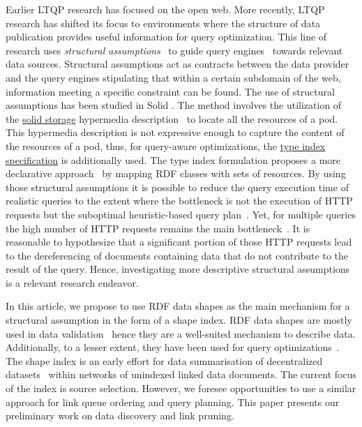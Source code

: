 Earlier LTQP research has focused on the open web.
More recently, LTQP research has shifted its focus to environments where the structure of data publication provides useful information for query optimization.
This line of research uses \emph{structural assumptions}~\cite{Taelman2023} to guide query engines~\cite{verborgh2020guided} towards relevant data sources.
Structural assumptions act as contracts between the data provider and the query engines stipulating that within a certain subdomain of the web, information meeting a specific constraint can be found.
The use of structural assumptions has been studied in Solid \cite{Taelman2023}.
The method involves the utilization of the 
\href{https://solidproject.org/TR/protocol#resources}{solid storage} hypermedia description~\cite{Fielding} to locate all the resources of a pod. 
This hypermedia description is not expressive enough to capture the content of the resources of a pod, thus, for query-aware optimizations, the \href{https://solid.github.io/type-indexes/}{type index specification} is additionally used.
The type index formulation proposes a more declarative approach~\cite{Taelman2017} by mapping RDF classes with sets of resources.
By using those structural assumptions it is possible to reduce the query execution time of realistic queries to the extent where the bottleneck is not the execution of HTTP requests but the suboptimal heuristic-based query plan~\cite{eschauzier_quweda_2023, Taelman2023}.
Yet, for multiple queries the high number of HTTP requests remains the main bottleneck~\cite{eschauzier_quweda_2023}.
It is reasonable to hypothesize that a significant portion of those HTTP requests lead to the dereferencing of documents containing data that do not contribute to the result of the query.
Hence, investigating more descriptive structural assumptions is a relevant research endeavor.

In this article, we propose to use RDF data shapes as the main mechanism for a structural assumption in the form of a shape index.
RDF data shapes are mostly used in data validation~\cite{Gayo2018a} hence they are a well-suited mechanism to describe data.
Additionally, to a lesser extent, they have been used for query optimizations~\cite{kashif2021}.
The shape index is an early effort for data summarisation of decentralized datasets~\cite{Stuckenschmidt2004,Goldman1997, Harth2010} within networks of unindexed linked data documents.
The current focus of the index is source selection.
However, we foresee opportunities to use a similar approach for link queue ordering and query planning.
This paper presents our preliminary work on data discovery and link pruning.
